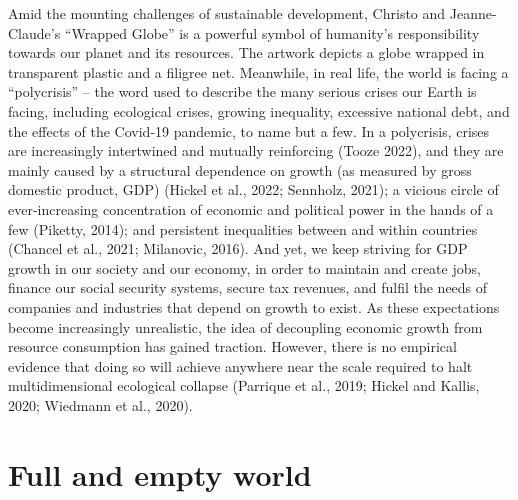 \documentclass[
  a4paper,
  openany]{book}
\begin{document}
Amid the mounting challenges of sustainable development, Christo and
Jeanne-Claude's ``Wrapped Globe'' is a powerful symbol of humanity's
responsibility towards our planet and its resources. The artwork depicts
a globe wrapped in transparent plastic and a filigree net. Meanwhile, in
real life, the world is facing a ``polycrisis'' -- the word used to
describe the many serious crises our Earth is facing, including
ecological crises, growing inequality, excessive national debt, and the
effects of the Covid-19 pandemic, to name but a few. In a polycrisis,
crises are increasingly intertwined and mutually reinforcing (Tooze
2022), and they are mainly caused by a structural dependence on growth
(as measured by gross domestic product, GDP) (Hickel et al., 2022;
Sennholz, 2021); a vicious circle of ever-increasing concentration of
economic and political power in the hands of a few (Piketty, 2014); and
persistent inequalities between and within countries (Chancel et al.,
2021; Milanovic, 2016). And yet, we keep striving for GDP growth in our
society and our economy, in order to maintain and create jobs, finance
our social security systems, secure tax revenues, and fulfil the needs
of companies and industries that depend on growth to exist. As these
expectations become increasingly unrealistic, the idea of decoupling
economic growth from resource consumption has gained traction. However,
there is no empirical evidence that doing so will achieve anywhere near
the scale required to halt multidimensional ecological collapse
(Parrique et al., 2019; Hickel and Kallis, 2020; Wiedmann et al., 2020).

\section*{Full and empty world}\label{full-and-empty-world}

\end{document}
